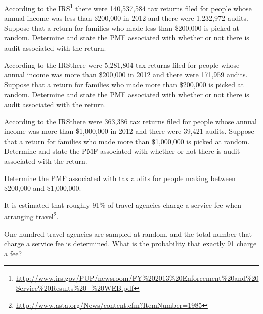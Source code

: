\begin{problem}


\item According to the
  IRS\footnote{\url{http://www.irs.gov/PUP/newsroom/FY\%202013\%20Enforcement\%20and\%20Service\%20Results\%20--\%20WEB.pdf}}
  there were 140,537,584 tax returns filed for people whose annual
  income was less than \$200,000 in 2012 and there were 1,232,972
  audits. Suppose that a return for families who made less than
  \$200,000 is picked at random. Determine and state the PMF
  associated with whether or not there is audit associated with the
  return.

  \vfill

\item According to the IRS\footnotemark[1] there were 5,281,804 tax returns filed for
  people whose annual income was more than \$200,000 in 2012 and there
  were 171,959 audits. Suppose that a return for families who made
  more than \$200,000 is picked at random. Determine and state the PMF
  associated with whether or not there is audit associated with the
  return.

  \vfill

\item According to the IRS\footnotemark[1] there were 363,386 tax returns filed for
  people whose annual income was more than \$1,000,000 in 2012 and
  there were 39,421 audits. Suppose that a return for families who
  made more than \$1,000,000 is picked at random. Determine and state
  the PMF associated with whether or not there is audit associated
  with the return.

  \vfill

\item Determine the PMF associated with tax audits for people making
  between \$200,000 and \$1,000,000.

  \vfill

\clearpage

\item It is estimated that roughly 91\% of travel agencies charge a
  service fee when arranging
  travel\footnote{\url{http://www.asta.org/News/content.cfm?ItemNumber=1985}}. 
  \begin{subproblem}
  \item One hundred travel agencies are sampled at random, and the
    total number that charge a service fee is determined. What is the
    probability that exactly 91 charge a fee?

    \vfill


\end{subproblem}
\end{problem}
